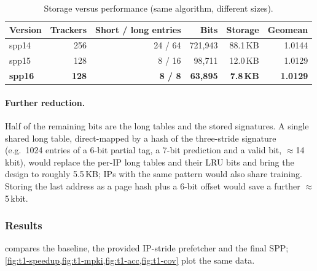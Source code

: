 \documentclass[12pt, a4paper]{article}
\newcommand{\tablesetup}{\small\renewcommand{\arraystretch}{1.15}\setlength{\tabcolsep}{4pt}}
\newcommand{\colhead}[1]{\textbf{#1}}
\begin{document}
\begin{table}[htbp]
\centering
\caption{Storage versus performance (same algorithm, different sizes).}\label{tab:storage-perf}
\tablesetup
\begin{tabular}{lrrrrr}
\toprule
\rowcolor{tablehead}\colhead{Version} & \colhead{Trackers} & \colhead{Short / long entries} & \colhead{Bits} & \colhead{Storage} & \colhead{Geomean} \\
\midrule
spp14 & 256 & 24 / 64 & 721{,}943 & 88.1\,KB & 1.0144 \\
spp15 & 128 & 8 / 16 & 98{,}711 & 12.0\,KB & 1.0129 \\
\textbf{spp16} & \textbf{128} & \textbf{8 / 8} & \textbf{63{,}895} & \textbf{7.8\,KB} & \textbf{1.0129} \\
\bottomrule
\end{tabular}
\end{table}

\paragraph{Further reduction.} Half of the remaining bits are the long tables
and the stored signatures. A single shared long table, direct-mapped by a
hash of the three-stride signature (e.g.\ 1024 entries of a 6-bit partial tag,
a 7-bit prediction and a valid bit, $\approx$14\,kbit), would replace the
per-IP long tables and their LRU bits and bring the design to roughly 5.5\,KB; IPs
with the same pattern would also share training. Storing the last address as a
page hash plus a 6-bit offset would save a further $\approx$5\,kbit.

\subsubsection{Results}\label{sec:task1-results}
 compares the baseline, the provided IP-stride
prefetcher and the final SPP; \cref{fig:t1-speedup,fig:t1-mpki,fig:t1-acc,fig:t1-cov}
plot the same data.
\end{document}

